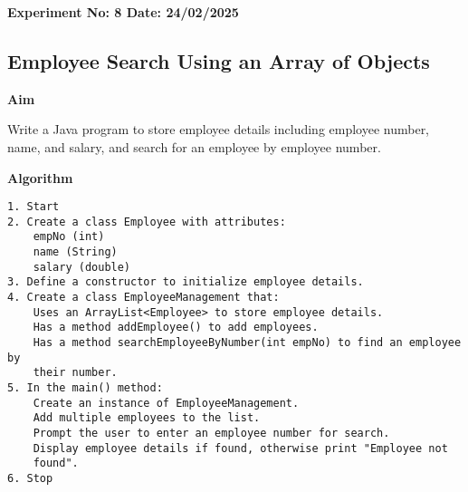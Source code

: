 \textbf{Experiment No: 8 \hfill Date: 24/02/2025}

\begin{center}
    \Large \subsection*{Employee Search Using an Array of Objects}
\end{center}

\textbf{Aim}
\vspace{0.5cm}

Write a Java program to store employee details including employee number, name, and salary, and search for an employee by employee number.

\vspace{0.5cm}
\textbf{Algorithm}
\vspace{0.5cm}
\begin{verbatim}
1. Start
2. Create a class Employee with attributes:
    empNo (int)
    name (String)
    salary (double)
3. Define a constructor to initialize employee details.
4. Create a class EmployeeManagement that:
    Uses an ArrayList<Employee> to store employee details.
    Has a method addEmployee() to add employees.
    Has a method searchEmployeeByNumber(int empNo) to find an employee by
    their number.
5. In the main() method:
    Create an instance of EmployeeManagement.
    Add multiple employees to the list.
    Prompt the user to enter an employee number for search.
    Display employee details if found, otherwise print "Employee not 
    found".
6. Stop
\end{verbatim}

